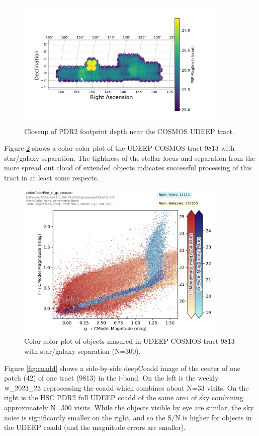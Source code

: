  \begin{figure}[hbt!]
 \includegraphics[width=0.9\textwidth]{r-band-cosmos-pdr2.png}
	 \caption{Closeup of PDR2 footprint depth near the COSMOS UDEEP tract.  \label{fig:footprint0}}
 \end{figure}

Figure \ref{fig:colorcolor} shows a color-color plot of the UDEEP COSMOS tract 9813 with star/galaxy
separation.  The tightness of the stellar locus and separation from the more spread out cloud of extended
objects indicates successful processing of this tract in at least some respects.

 \begin{figure}[hbt!]
 \includegraphics[width=0.9\textwidth]{colorColor9813.png}
	 \caption{Color color plot of objects masured in UDEEP COSMOS tract 9813 with star/galaxy separation (N=300).  \label{fig:colorcolor}}
 \end{figure}

Figure \ref{fig:coadd} shows a side-by-side deepCoadd image of the center of one patch (42) of one tract
(9813) in the i-band.  On the left is the weekly $\rm w\_2023\_23$ reprocessing the coadd which combines about
N=33 visits.  On the right is the HSC PDR2 full UDEEP coadd of the same area of sky combining approximately
N=300 visits.   While the objects visible by eye are similar, the sky noise is significantly smaller on the
right, and so the S/N is higher for objects in the UDEEP coadd (and the magnitude errors are smaller).


